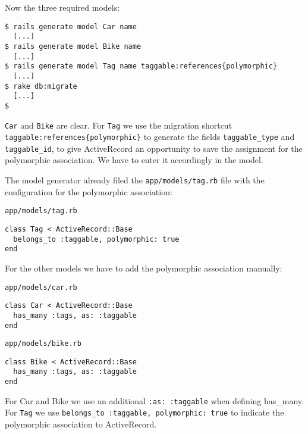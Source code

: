 \documentclass[a4paper]{book}
\begin{document}
Now the three required models:

\begin{shaded}\begin{verbatim}
$ rails generate model Car name
  [...]
$ rails generate model Bike name
  [...]
$ rails generate model Tag name taggable:references{polymorphic}
  [...]
$ rake db:migrate
  [...]
$
\end{verbatim}\end{shaded}

\texttt{Car} and \texttt{Bike} are clear. For \texttt{Tag} we use the migration shortcut \texttt{taggable:references\{polymorphic\}} to generate the fields \texttt{taggable\_type} and \texttt{taggable\_id}, to give ActiveRecord an opportunity to save the assignment for the polymorphic association. We have to enter it accordingly in the model.

The model generator already filed the \texttt{app/models/tag.rb} file with the configuration for the polymorphic association:

\texttt{app/models/tag.rb}

\begin{shaded}\begin{verbatim}
class Tag < ActiveRecord::Base
  belongs_to :taggable, polymorphic: true
end
\end{verbatim}\end{shaded}

For the other models we have to add the polymorphic association manually:

\texttt{app/models/car.rb}

\begin{shaded}\begin{verbatim}
class Car < ActiveRecord::Base
  has_many :tags, as: :taggable
end
\end{verbatim}\end{shaded}

\texttt{app/models/bike.rb}

\begin{shaded}\begin{verbatim}
class Bike < ActiveRecord::Base
  has_many :tags, as: :taggable
end
\end{verbatim}\end{shaded}

For Car and Bike we use an additional \texttt{:as: :taggable} when defining has\_many. For \texttt{Tag} we use \texttt{belongs\_to   :taggable, polymorphic: true} to indicate the polymorphic association to ActiveRecord.
\end{document}
